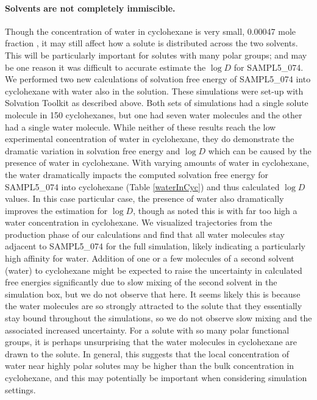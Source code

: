 \paragraph{Solvents are not completely immiscible.} 
Though the concentration of water in cyclohexane is very small, 0.00047 mole fraction  \cite{Black:1948bs}, it may still affect how a solute is distributed across the two solvents. 
This will be particularly important for solutes with many polar groups; and may be one reason it was difficult to accurate estimate the $\log D$ for SAMPL5\_074.
We performed two new calculations of solvation free energy of SAMPL5\_074 into cyclohexane with water also in the solution. 
These simulations were set-up with Solvation Toolkit as described above.
Both sets of simulations had a single solute molecule in 150 cyclohexanes, but one had seven water molecules and the other had a single water molecule. 
While neither of these results reach the low experimental concentration of water in cyclohexane, they do demonstrate the dramatic variation in solvation free energy and $\log D$ which can be caused by the presence of water in cyclohexane. 
With varying amounts of water in cyclohexane, the water dramatically impacts the computed solvation free energy for SAMPL5\_074 into cyclohexane (Table \ref{waterInCyc}) and thus calculated $\log D$ values. 
In this case particular case, the presence of water also dramatically improves the estimation for $\log D$, though as noted this is with far too high a water concentration in cyclohexane. 
We visualized trajectories from the production phase of our calculations and find that all water molecules stay adjacent to SAMPL5\_074 for the full simulation, likely indicating a particularly high affinity for water. 
Addition of one or a few molecules of a second solvent (water) to cyclohexane might be expected to raise the uncertainty in calculated free energies significantly due to slow mixing of the second solvent in the simulation box, but we do not observe that here. 
It seems likely this is because the water molecules are so strongly attracted to the solute that they essentially stay bound throughout the simulations, so we do not observe slow mixing and the associated increased uncertainty.  
For a solute with so many polar functional groups, it is perhaps unsurprising that the water molecules in cyclohexane are drawn to the solute. 
In general, this suggests that the local concentration of water near highly polar solutes may be higher than the bulk concentration in cyclohexane, and this may potentially be important when considering simulation settings.

